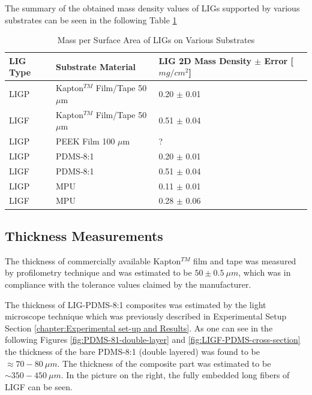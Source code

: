 The summary of the obtained mass density values of LIGs supported by various substrates can be seen in the following Table \ref{tab:LIG_mass} 
\begin{table}[H]
\centering
    \caption{Mass per Surface Area of LIGs on Various Substrates}
    \label{tab:LIG_mass} 
\medskip
\medskip
\centering
\begin{tabular}{ l | l | l  } 

LIG Type & Substrate Material & \pbox{100px}{LIG 2D Mass Density\\ $\pm$ Error [$mg/cm^2$]}\\[15px]
\hline
LIGP & Kapton$^{TM}$ Film/Tape 50 $\mu$m & 0.20 $\pm$ 0.01 \\ [13px]
LIGF & Kapton$^{TM}$ Film/Tape 50 $\mu$m & 0.51 $\pm$ 0.04\\ [13px]
LIGP & PEEK Film 100 $\mu$m & ? \\ [13px]
LIGP & PDMS-8:1 & 0.20 $\pm$ 0.01 \\ [13px]
LIGF & PDMS-8:1 & 0.51 $\pm$ 0.04\\ [13px]
LIGP & MPU & 0.11 $\pm$ 0.01 \\ [13px]
LIGF & MPU & 0.28 $\pm$ 0.06\\ [13px]
\end{tabular}
\end{table}

\subsection{Thickness Measurements}

The thickness of commercially available Kapton$^{TM}$ film and tape was measured by profilometry technique and was estimated to be $50\pm0.5\:\mu m$, which was in compliance with the tolerance values claimed by the manufacturer.

The thickness of LIG-PDMS-8:1 composites was estimated by the light microscope technique which was previously described in Experimental Setup Section \ref{chapter:Experimental set-up and Results}. As one can see in the following Figures \ref{fig:PDMS-81-double-layer} and \ref{fig:LIGF-PDMS-cross-section} the thickness of the bare PDMS-8:1 (double layered) was found to be $\approx70-80\:\mu m$. The thickness of the composite part was estimated to be $\sim 350-450\:\mu m$. In the picture on the right, the fully embedded long fibers of LIGF can be seen. 

